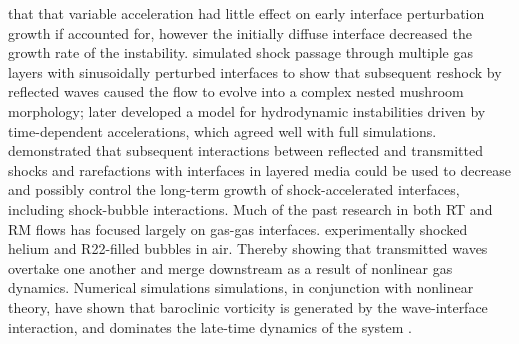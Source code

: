 \documentclass{jfm}%
\begin{document}
that that variable acceleration had little effect on early interface
perturbation growth if accounted for, however the initially diffuse
interface decreased the growth rate of the
instability. \cite{Mikaelian1996} simulated shock passage through
multiple gas layers with sinusoidally perturbed interfaces to show
that subsequent reshock by reflected waves caused the flow to evolve
into a complex nested mushroom morphology; later \cite{Mikaelian2009}
developed a model for hydrodynamic instabilities driven by
time-dependent accelerations, which agreed well with full
simulations. \cite{HenrydeFrahan2015b} demonstrated that subsequent
interactions between reflected and transmitted shocks and rarefactions
with interfaces in layered media could be used to decrease and
possibly control the long-term growth of shock-accelerated interfaces,
including shock-bubble interactions. Much of the past research in both
RT and RM flows has focused largely on gas-gas
interfaces. \cite{Haas1987} experimentally shocked helium and
R22-filled bubbles in air. Thereby showing that transmitted waves
overtake one another and merge downstream as a result of nonlinear gas
dynamics. Numerical simulations simulations, in conjunction with
nonlinear theory, have shown that baroclinic vorticity is generated by
the wave-interface interaction, and dominates the late-time dynamics
of the system \citep{Picone1988,Quirk1996}.

\end{document}
